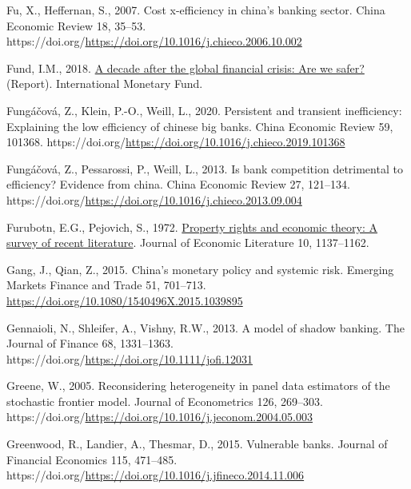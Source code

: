 \documentclass[
  12pt,
  a4paper,
]{scrreprt}
\newlength{\cslhangindent}
\newenvironment{CSLReferences}[2] %
 {\begin{list}{}{%
  \setlength{\itemindent}{0pt}
  \setlength{\leftmargin}{0pt}
  \setlength{\parsep}{0pt}
  \ifodd #1
   \setlength{\leftmargin}{\cslhangindent}
   \setlength{\itemindent}{-1\cslhangindent}
  \fi
  \setlength{\itemsep}{#2\baselineskip}}}
 {\end{list}}
\begin{document}
\begin{CSLReferences}{1}{0}
Fu, X., Heffernan, S., 2007. Cost x-efficiency in china's banking
sector. China Economic Review 18, 35--53.
https://doi.org/\url{https://doi.org/10.1016/j.chieco.2006.10.002}

Fund, I.M., 2018.
\href{https://www.imf.org/en/Publications/GFSR/Issues/2018/09/25/Global-Financial-Stability-Report-October-2018\#:~:text=Chapter\%201\%3A\%20A\%20Decade\%20after,economies\%20and\%20escalating\%20trade\%20tensions.}{A
decade after the global financial crisis: Are we safer?} (Report).
International Monetary Fund.

Fungáčová, Z., Klein, P.-O., Weill, L., 2020. Persistent and transient
inefficiency: Explaining the low efficiency of chinese big banks. China
Economic Review 59, 101368.
https://doi.org/\url{https://doi.org/10.1016/j.chieco.2019.101368}

Fungáčová, Z., Pessarossi, P., Weill, L., 2013. Is bank competition
detrimental to efficiency? Evidence from china. China Economic Review
27, 121--134.
https://doi.org/\url{https://doi.org/10.1016/j.chieco.2013.09.004}

Furubotn, E.G., Pejovich, S., 1972.
\href{http://www.jstor.org/stable/2721541}{Property rights and economic
theory: A survey of recent literature}. Journal of Economic Literature
10, 1137--1162.

Gang, J., Qian, Z., 2015. China's monetary policy and systemic risk.
Emerging Markets Finance and Trade 51, 701--713.
\url{https://doi.org/10.1080/1540496X.2015.1039895}

Gennaioli, N., Shleifer, A., Vishny, R.W., 2013. A model of shadow
banking. The Journal of Finance 68, 1331--1363.
https://doi.org/\url{https://doi.org/10.1111/jofi.12031}

Greene, W., 2005. Reconsidering heterogeneity in panel data estimators
of the stochastic frontier model. Journal of Econometrics 126, 269--303.
https://doi.org/\url{https://doi.org/10.1016/j.jeconom.2004.05.003}

Greenwood, R., Landier, A., Thesmar, D., 2015. Vulnerable banks. Journal
of Financial Economics 115, 471--485.
https://doi.org/\url{https://doi.org/10.1016/j.jfineco.2014.11.006}


\end{CSLReferences}
\end{document}
